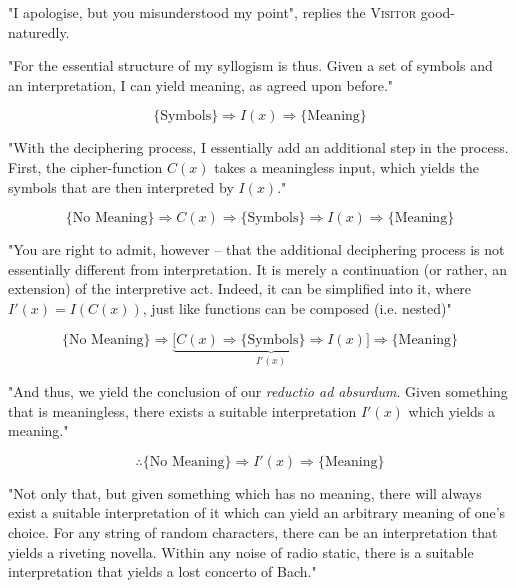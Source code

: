 "I apologise, but you misunderstood my point", replies the \textsc{Visitor} good-naturedly.

"For the essential structure of my syllogism is thus. Given a set of symbols and an interpretation, I can yield meaning, as agreed upon before."

\begin{equation*}
  \{\text{Symbols}\} \Rightarrow I(x) \Rightarrow \{\text{Meaning}\}
\end{equation*}

"With the deciphering process, I essentially add an additional step in the process. First, the cipher-function $C(x)$ takes a meaningless input, which yields the symbols that are then interpreted by $I(x)$."

\begin{equation*}
  \{\text{No Meaning}\} \Rightarrow C(x) \Rightarrow \{\text{Symbols}\} \Rightarrow I(x) \Rightarrow \{\text{Meaning}\}
\end{equation*}

"You are right to admit, however -- that the additional deciphering process is not essentially different from interpretation. It is merely a continuation (or rather, an extension) of the interpretive act. Indeed, it can be simplified into it, where $I'(x) = I(C(x))$, just like functions can be composed (i.e. nested)"

\begin{equation*}
  \{\text{No Meaning}\} \Rightarrow \underbrace{ \big[ C(x) \Rightarrow \{\text{Symbols}\} \Rightarrow I(x) \big] }_{I'(x)} \Rightarrow \{\text{Meaning}\}
\end{equation*}

\noindent
"And thus, we yield the conclusion of our \emph{reductio ad absurdum}. Given something that is meaningless, there exists a suitable interpretation $I'(x)$ which yields a meaning."

\begin{equation*}
  \therefore \{\text{No Meaning}\} \Rightarrow I'(x) \Rightarrow \{\text{Meaning}\}
\end{equation*}

"Not only that, but given something which has no meaning, there will always exist a suitable interpretation of it which can yield an arbitrary meaning of one's choice. For any string of random characters, there can be an interpretation that yields a riveting novella. Within any noise of radio static, there is a suitable interpretation that yields a lost concerto of Bach."

